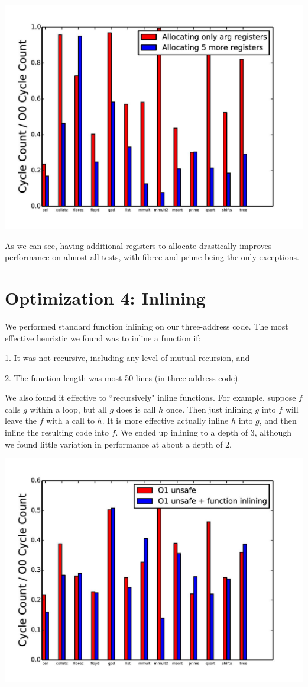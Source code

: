 \documentclass{article}
\begin{document}
\includegraphics[scale=0.5]{allocating_more_regs-page-001}

As we can see, having additional registers to allocate drastically improves performance on almost all tests, with fibrec and prime being the only exceptions.

\section{Optimization 4: Inlining}

We performed standard function inlining on our three-address code. The most effective heuristic we found was to inline a function if:

1. It was not recursive, including any level of mutual recursion, and

2. The function length was most 50 lines (in three-address code).

\noindent We also found it effective to ``recursively" inline functions. For example, suppose $f$ calls $g$ within a loop, but all $g$ does is call $h$ once. Then just inlining $g$ into $f$ will leave the $f$ with a call to $h$. It is more effective actually inline $h$ into $g$, and then inline the resulting code into $f$. We ended up inlining to a depth of 3, although we found little variation in performance at about a depth of 2.

\includegraphics[scale=0.5]{O1_vs_inlining-page-001}
\end{document}

